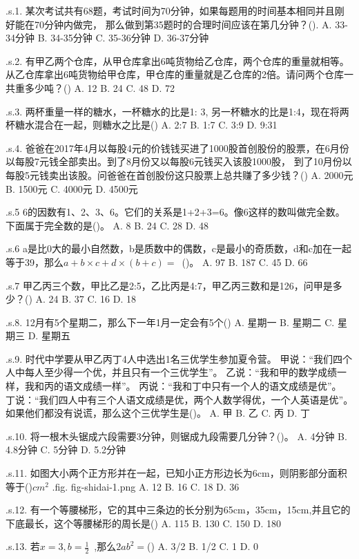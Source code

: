 .s.1. 某次考试共有68题，考试时间为70分钟，如果每题用的时间基本相同并且刚好能在70分钟内做完，
那么做到第35题时的合理时间应该在第几分钟？(\quad).
A. 33-34分钟
B. 34-35分钟
C. 35-36分钟
D. 36-37分钟

.s.2. 有甲乙两个仓库，从甲仓库拿出6吨货物给乙仓库，两个仓库的重量就相等。从乙仓库拿出6吨货物给甲仓库，甲仓库的重量就是乙仓库的2倍。请问两个仓库一共重多少吨？(\quad)
A. 12
B. 24
C. 48
D. 72

.s.3. 两杯重量一样的糖水，一杯糖水的比是1: 3, 另一杯糖水的比是1:4，现在将两杯糖水混合在一起，则糖水之比是(\quad)
A. 2:7
B. 1:7
C. 3:9
D. 9:31

.s.4. 爸爸在2017年4月以每股4元的价钱钱买进了1000股首创股份的股票，在6月份以每股7元钱全部卖出。到了8月份又以每股6元钱买入该股1000股，
到了10月份以每股5元钱卖出该股。问爸爸在首创股份这只股票上总共赚了多少钱？(\quad)
A. 2000元
B. 1500元
C. 4000元
D. 4500元

.s.5 6的因数有1、2、3、6。它们的关系是1+2+3=6。像6这样的数叫做完全数。下面属于完全数的是(\quad)。
A. 8
B. 24
C. 28
D. 48

.s.6 a是比0大的最小自然数，b是质数中的偶数，c是最小的奇质数，d和c加在一起等于39，那么$a+b\times c + d\times(b+c) = $~(\quad)。
A. 97
B. 187
C. 45
D. 66

.s.7 甲乙丙三个数，甲比乙是2:5，乙比丙是4:7，甲乙丙三数和是126，问甲是多少？(\quad)
A. 24
B. 37
C. 16
D. 18

.s.8. 12月有5个星期二，那么下一年1月一定会有5个(\quad)
A. 星期一
B. 星期二
C. 星期三
D. 星期五

.s.9. 时代中学要从甲乙丙丁4人中选出1名三优学生参加夏令营。
甲说：“我们四个人中每人至少得一个优，并且只有一个三优学生”。
乙说：“我和甲的数学成绩一样，我和丙的语文成绩一样”。
丙说：“我和丁中只有一个人的语文成绩是优”。
丁说：“我们四人中有三个人语文成绩是优，两个人数学得优，一个人英语是优”。
如果他们都没有说谎，那么这个三优学生是(\quad)。
A. 甲
B. 乙
C. 丙
D. 丁

.s.10. 将一根木头锯成六段需要3分钟，则锯成九段需要几分钟？(\quad)。
A. 4分钟
B. 4.8分钟
C. 5分钟
D. 5.2分钟

.s.11. 如图大小两个正方形并在一起，已知小正方形边长为6cm，则阴影部分面积等于(\quad)$cm^2$
.fig. fig-shidai-1.png
A. 12
B. 16
C. 18
D. 36

.s.12. 有一个等腰梯形，它的其中三条边的长分别为65cm，35cm，15cm,并且它的下底最长，这个等腰梯形的周长是(\quad)
A. 115
B. 130
C. 150
D. 180

.s.13. 若$x=3,b=\frac{1}{2}$~,那么$2ab^2=$(\quad)
A. 3/2
B. 1/2
C. 1
D. 0


